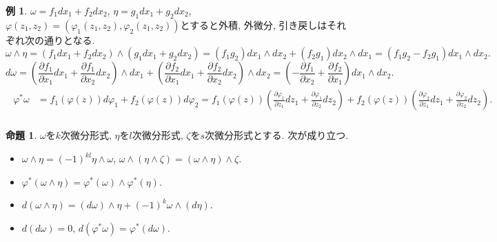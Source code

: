 \documentclass[dvipdfmx,a4paper,11pt]{article}
\theoremstyle{definition}
\newtheorem{prop}[thm]{命題}
\newtheorem{rem}[thm]{補足}
\newtheorem{exa}[thm]{例}
\newcommand{\pdrv}[2]{\frac{\partial #1}{\partial #2}}
\begin{document}
 
 \begin{exa}
 $\omega=f_1dx_1+ f_2dx_2$,  $\eta=g_1dx_1+ g_2dx_2$, $\varphi (z_1, z_2) = (\varphi_1(z_1,z_2), \varphi_2(z_1,z_2))$とすると外積, 外微分, 引き戻しはそれぞれ次の通りとなる. 
 $$
 \omega \wedge \eta = (f_1dx_1+ f_2dx_2) \wedge (g_1dx_1+ g_2dx_2)
 = (f_1g_2)dx_1 \wedge dx_2 + (f_2g_1)dx_2 \wedge dx_1 = (f_1g_2 - f_2 g_1) dx_1 \wedge dx_2.
 $$
 $$
 d \omega = \left(\pdrv{f_1}{x_1} dx_1+ \pdrv{f_1}{x_2} dx_2\right) \wedge dx_1 + \left(\pdrv{f_2}{x_1} dx_1+ \pdrv{f_2}{x_2} dx_2\right) \wedge dx_2
= \left( -\pdrv{f_1}{x_2} + \pdrv{f_2}{x_1}\right)dx_1 \wedge dx_2.
 $$
 \begin{align*}
\begin{split}
 \varphi^{*}\omega
& =
 f_{1} (\varphi(z)) d\varphi_{1} +  f_{2} (\varphi(z)) d\varphi_{2}
 =
  f_{1} (\varphi(z)) \left(\pdrv{\varphi_1}{z_1} dz_1 + \pdrv{\varphi_1}{z_2} dz_2 \right) 
  +  f_{2} (\varphi(z)) \left(\pdrv{\varphi_2}{z_1} dz_1 + \pdrv{\varphi_2}{z_2} dz_2 \right). \\
\end{split}
 \end{align*}
 
 \end{exa}


  \begin{tcolorbox}[
    colback = white,
    colframe = green!35!black,
    fonttitle = \bfseries,
    breakable = true]
\begin{prop}
$\omega$を$k$次微分形式, $\eta$を$l$次微分形式, $\zeta$を$s$次微分形式とする. 次が成り立つ.
\begin{itemize}
 \setlength{\parskip}{0cm}
  \setlength{\itemsep}{2pt} 
\item$\omega \wedge \eta = (-1)^{kl} \eta \wedge \omega$, $\omega \wedge (\eta  \wedge \zeta)= (\omega \wedge \eta)  \wedge \zeta$. 
\item $\varphi^{*}(\omega \wedge \eta) = \varphi^{*}(\omega) \wedge \varphi^{*}(\eta)$.
\item $d(\omega \wedge \eta ) = (d \omega) \wedge \eta + (-1)^{k}\omega \wedge (d \eta)$.
    \item $d(d \omega)=0$, $d(\varphi^{*}\omega)=\varphi^{*}(d \omega)$.
\end{itemize}
    \end{prop}
    \end{tcolorbox}
  
\end{document}
